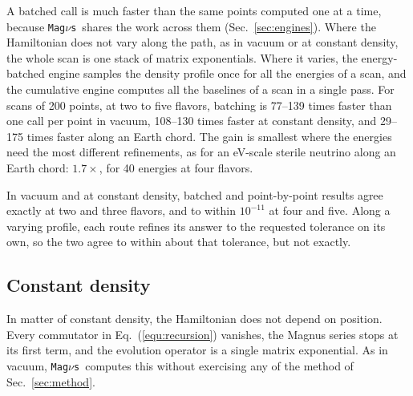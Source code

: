 \documentclass[final,5p,times,twocolumn,sort,compress]{elsarticle}
\makeatletter
\newcommand{\eq}{Eq.}
\DeclareRobustCommand{\_}{%
  \ifmmode\nfss@text{\textunderscore}\else\textunderscore\allowbreak\fi}
\newcommand{\equ}[1]{\eq~(\ref{equ:#1})}
\newcommand{\magnus}{{\tt Mag}\ensuremath{\nu}{\tt s}}
\makeatother
\begin{document}
A batched call is much faster than the same points computed one at a time, because \magnus\ shares the work across them (Sec.~\ref{sec:engines}). Where the Hamiltonian does not vary along the path, as in vacuum or at constant density, the whole scan is one stack of matrix exponentials. Where it varies, the energy-batched engine samples the density profile once for all the energies of a scan, and the cumulative engine computes all the baselines of a scan in a single pass. For scans of 200 points, at two to five flavors, batching is 77--139 times faster than one call per point in vacuum, 108--130 times faster at constant density, and 29--175 times faster along an Earth chord. The gain is smallest where the energies need the most different refinements, as for an eV-scale sterile neutrino along an Earth chord: $1.7 \times$, for 40 energies at four flavors.

In vacuum and at constant density, batched and point-by-point results agree exactly at two and three flavors, and to within $10^{-11}$ at four and five. Along a varying profile, each route refines its answer to the requested tolerance on its own, so the two agree to within about that tolerance, but not exactly.


\subsection{Constant density}
\label{sec:constant_density}

In matter of constant density, the Hamiltonian does not depend on position. Every commutator in \equ{recursion} vanishes, the Magnus series stops at its first term, and the evolution operator is a single matrix exponential. As in vacuum, \magnus\ computes this without exercising any of the method of Sec.~\ref{sec:method}.
\end{document}
